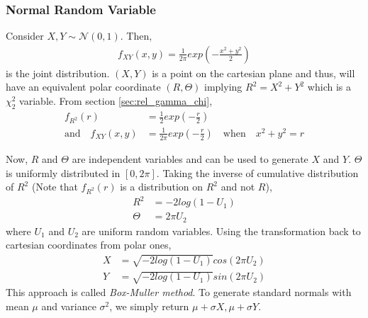 \documentclass[../probability-notes.tex]{subfiles}
\begin{document}
    \subsubsection{Normal Random Variable}
    Consider $X, Y \sim \mathcal{N}(0, 1)$. Then,
    \begin{align*}
        f_{XY}(x,y) = \frac{1}{2\pi}exp(-\frac{x^{2}+y^{2}}{2})
    \end{align*}
    is the joint distribution. $(X, Y)$ is a point on the cartesian plane and thus, will have an equivalent polar coordinate $(R, \Theta)$ implying $R^{2} = X^{2} + Y^{2}$ which is a $\chi_{2}^{2}$ variable. From section \ref{sec:rel_gamma_chi},
    \begin{align*}
       f_{R^{2}}(r) &= \frac{1}{2}exp(-\frac{r}{2})\\
       \text{and} \quad f_{XY}(x,y) &= \frac{1}{2\pi} exp(-\frac{r}{2}) \quad \text{when} \quad x^{2} + y^{2} = r
    \end{align*}

    Now, $R$ and $\Theta$ are independent variables and can be used to generate $X$ and $Y$. $\Theta$ is uniformly distributed in $[0, 2\pi]$. Taking the inverse of cumulative distribution of $R^{2}$ (Note that $f_{R^{2}}(r)$ is a distribution on $R^{2}$ and not $R$),
    \begin{align*}
        R^{2} &= -2log(1 - U_{1})\\
        \Theta &= 2\pi U_{2}
    \end{align*}
    where $U_{1}$ and $U_{2}$ are uniform random variables. Using the transformation back to cartesian coordinates from polar ones,
    \begin{align*}
        X &= \sqrt{-2log(1 - U_{1})}cos(2\pi U_{2})\\
        Y &= \sqrt{-2log(1 - U_{1})}sin(2\pi U_{2})
    \end{align*}
    This approach is called \emph{Box-Muller method}. To generate standard normals with mean $\mu$ and variance $\sigma^{2}$, we simply return $\mu + \sigma X, \mu+\sigma Y$.
\end{document}
